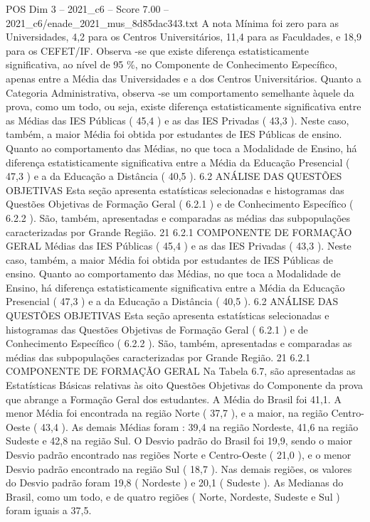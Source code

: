 \begin{textsample}{POS Dim 3 – 2021\_c6 – Score 7.00 – 2021\_c6/enade\_2021\_mus\_8d85dac343.txt}
A nota Mínima foi zero para as Universidades, 4,2 para os Centros Universitários, 11,4 para as Faculdades, e 18,9 para os CEFET/IF.
Observa -se que existe diferença estatisticamente significativa, ao nível de 95 \%, no Componente de Conhecimento Específico, apenas entre a Média das Universidades e a dos Centros Universitários.
Quanto a Categoria Administrativa, observa -se um comportamento semelhante àquele da prova, como um todo, ou seja, existe diferença estatisticamente significativa entre as Médias das IES Públicas ( 45,4 ) e as das IES Privadas ( 43,3 ).
Neste caso, também, a maior Média foi obtida por estudantes de IES Públicas de ensino.
Quanto ao comportamento das Médias, no que toca a Modalidade de Ensino, há diferença estatisticamente significativa entre a Média da Educação Presencial ( 47,3 ) e a da Educação a Distância ( 40,5 ). 6.2 ANÁLISE DAS QUESTÕES OBJETIVAS Esta seção apresenta estatísticas selecionadas e histogramas das Questões Objetivas de Formação Geral ( 6.2.1 ) e de Conhecimento Específico ( 6.2.2 ).
São, também, apresentadas e comparadas as médias das subpopulações caracterizadas por Grande Região. 21 6.2.1 COMPONENTE DE FORMAÇÃO GERAL Médias das IES Públicas ( 45,4 ) e as das IES Privadas ( 43,3 ).
Neste caso, também, a maior Média foi obtida por estudantes de IES Públicas de ensino.
Quanto ao comportamento das Médias, no que toca a Modalidade de Ensino, há diferença estatisticamente significativa entre a Média da Educação Presencial ( 47,3 ) e a da Educação a Distância ( 40,5 ). 6.2 ANÁLISE DAS QUESTÕES OBJETIVAS Esta seção apresenta estatísticas selecionadas e histogramas das Questões Objetivas de Formação Geral ( 6.2.1 ) e de Conhecimento Específico ( 6.2.2 ).
São, também, apresentadas e comparadas as médias das subpopulações caracterizadas por Grande Região. 21 6.2.1 COMPONENTE DE FORMAÇÃO GERAL Na Tabela 6.7, são apresentadas as Estatísticas Básicas relativas às oito Questões Objetivas do Componente da prova que abrange a Formação Geral dos estudantes.
A Média do Brasil foi 41,1.
A menor Média foi encontrada na região Norte ( 37,7 ), e a maior, na região Centro-Oeste ( 43,4 ).
As demais Médias foram : 39,4 na região Nordeste, 41,6 na região Sudeste e 42,8 na região Sul.
O Desvio padrão do Brasil foi 19,9, sendo o maior Desvio padrão encontrado nas regiões Norte e Centro-Oeste ( 21,0 ), e o menor Desvio padrão encontrado na região Sul ( 18,7 ).
Nas demais regiões, os valores do Desvio padrão foram 19,8 ( Nordeste ) e 20,1 ( Sudeste ).
As Medianas do Brasil, como um todo, e de quatro regiões ( Norte, Nordeste, Sudeste e Sul ) foram iguais a 37,5.

\end{textsample}
